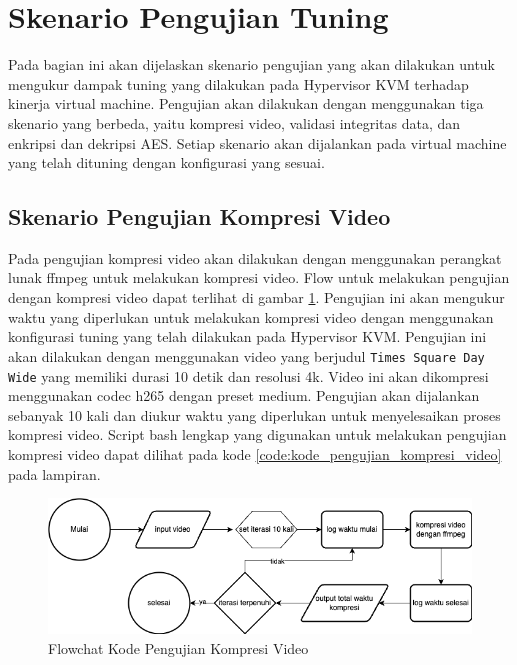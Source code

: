 \section{Skenario Pengujian Tuning}
Pada bagian ini akan dijelaskan skenario pengujian yang akan dilakukan untuk mengukur dampak tuning yang dilakukan pada Hypervisor KVM terhadap kinerja virtual machine. Pengujian akan dilakukan dengan menggunakan tiga skenario yang berbeda, yaitu kompresi video, validasi integritas data, dan enkripsi dan dekripsi AES. Setiap skenario akan dijalankan pada virtual machine yang telah dituning dengan konfigurasi yang sesuai.

\subsection{Skenario Pengujian Kompresi Video}
Pada pengujian kompresi video akan dilakukan dengan menggunakan perangkat lunak ffmpeg untuk melakukan kompresi video. Flow untuk melakukan pengujian dengan kompresi video dapat terlihat di gambar \ref{fig:flowchart_kompresi_video}. Pengujian ini akan mengukur waktu yang diperlukan untuk melakukan kompresi video dengan menggunakan konfigurasi tuning yang telah dilakukan pada Hypervisor KVM. Pengujian ini akan dilakukan dengan menggunakan video yang berjudul \texttt{Times Square Day Wide} yang memiliki durasi 10 detik dan resolusi 4k. Video ini akan dikompresi menggunakan codec h265 dengan preset medium. Pengujian akan dijalankan sebanyak 10 kali dan diukur waktu yang diperlukan untuk menyelesaikan proses kompresi video. Script bash lengkap yang digunakan untuk melakukan pengujian kompresi video dapat dilihat pada kode \ref{code:kode_pengujian_kompresi_video} pada lampiran.

\begin{figure}
    \centering
    \includegraphics[width=1\textwidth]
    {assets/pics/code-flowchart/flowchart_kompresi_video.png}
    \caption{Flowchat Kode Pengujian Kompresi Video}
    \label{fig:flowchart_kompresi_video}
\end{figure}

